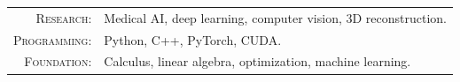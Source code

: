 
\renewcommand{\arraystretch}{1.05}

	\begin{tabular}{>{}r>{}p{13.5cm}} 
	 	\textsc{Research:}			& Medical AI, deep learning, computer vision, 3D reconstruction. \\
		\textsc{Programming:}    & Python, C++, PyTorch, CUDA.\\
		\textsc{Foundation:} 		& Calculus, linear algebra, optimization, machine learning.
	\end{tabular}
